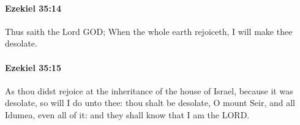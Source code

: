 		\paragraph{Ezekiel 35:14} %
			\label{EZEKIEL-35-14}

			Thus saith the Lord GOD; When the whole earth rejoiceth, I will make thee desolate.


		\paragraph{Ezekiel 35:15} %
			\label{EZEKIEL-35-15}

			As thou didst rejoice at the inheritance of the house of Israel, because it was desolate, so will I do unto thee: thou shalt be desolate, O mount Seir, and all Idumea, even all of it: and they shall know that I am the LORD.

